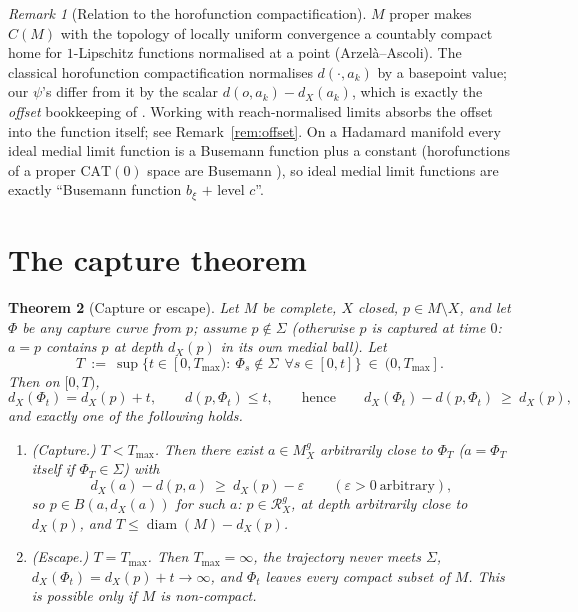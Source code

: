 \documentclass[11pt]{article}
\newtheorem{theorem}{Theorem}[section]
\theoremstyle{remark}
\newtheorem{remark}[theorem]{Remark}
\newcommand{\X}{X}
\newcommand{\Mg}{M^{g}_{\X}}
\newcommand{\Rg}{\mathcal{R}^{g}_{\X}}
\newcommand{\dX}{d_{\X}}
\begin{document}
\begin{remark}[Relation to the horofunction compactification]
\label{rem:horo}
$M$ proper makes $C(M)$ with the topology of locally uniform
convergence a countably compact home for $1$-Lipschitz functions
normalised at a point (Arzel\`a--Ascoli). The classical horofunction
compactification \cite{Gro,BH} normalises $d(\cdot,a_{k})$ by a
basepoint value; our $\psi$'s differ from it by the scalar
$d(o,a_{k})-\dX(a_{k})$, which is exactly the \emph{offset} bookkeeping
of \cite[Thm.~3.4]{R3}. Working with reach-normalised limits absorbs
the offset into the function itself; see Remark~\ref{rem:offset}. On a
Hadamard manifold every ideal medial limit function is a Busemann
function plus a constant (horofunctions of a proper $\mathrm{CAT}(0)$
space are Busemann \cite[II.8.13]{BH}), so ideal medial limit
functions are exactly ``Busemann function $b_{\xi}$ $+$ level $c$''.
\end{remark}

\section{The capture theorem}\label{sec:capture}

\begin{theorem}[Capture or escape]\label{thm:capture}
Let $M$ be complete, $\X$ closed, $p\in M\setminus\X$, and let $\Phi$
be any capture curve from $p$; assume $p\notin\Sigma$ (otherwise $p$
is captured at time $0$: $a=p$ contains $p$ at depth $\dX(p)$ in its
own medial ball). Let
\[
  T\ :=\ \sup\bigl\{t\in[0,T_{\max}):\ \Phi_{s}\notin\Sigma\ \ \forall
  s\in[0,t]\bigr\}\ \in\ (0,T_{\max}].
\]
Then on $[0,T)$,
\begin{equation}\label{eq:rateone}
  \dX(\Phi_{t})=\dX(p)+t,
  \qquad
  d(p,\Phi_{t})\le t,
  \qquad\text{hence}\qquad
  \dX(\Phi_{t})-d(p,\Phi_{t})\ \ge\ \dX(p),
\end{equation}
and exactly one of the following holds.
\begin{enumerate}[label=\textup{(\roman*)}]
\item\emph{(Capture.)} $T<T_{\max}$. Then there exist $a\in\Mg$
arbitrarily close to $\Phi_{T}$ \textup{(}$a=\Phi_{T}$ itself if
$\Phi_{T}\in\Sigma$\textup{)} with
\[
  \dX(a)-d(p,a)\ \ge\ \dX(p)-\varepsilon
  \qquad(\varepsilon>0\ \text{arbitrary}),
\]
so $p\in B(a,\dX(a))$ for such $a$: \quad $p\in\Rg$, at depth
arbitrarily close to $\dX(p)$, and $T\le\operatorname{diam}(M)-\dX(p)$.
\item\emph{(Escape.)} $T=T_{\max}$. Then $T_{\max}=\infty$, the
trajectory never meets $\Sigma$, $\dX(\Phi_{t})=\dX(p)+t\to\infty$, and
$\Phi_{t}$ leaves every compact subset of $M$. This is possible only
if $M$ is non-compact.
\end{enumerate}
\end{theorem}
\end{document}
